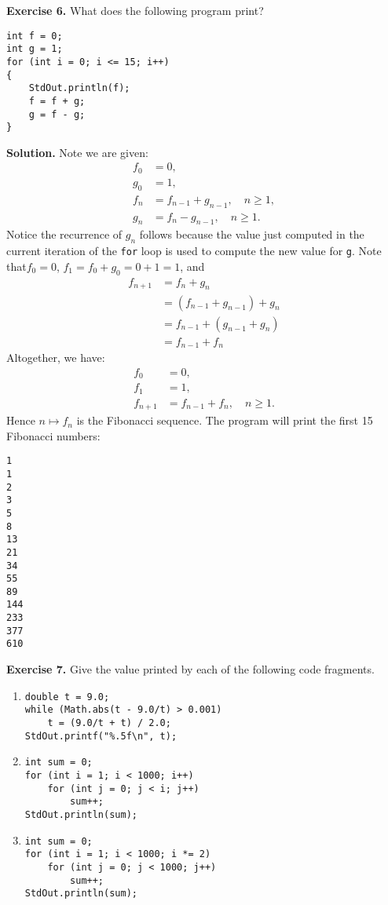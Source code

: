 \documentclass[12pt, a4paper]{article}
\newenvironment{ex}[2][Exercise]
{\par\medskip\noindent \textbf{#1 #2.}}
{\medskip}
\newenvironment{sol}[1][Solution]
{\par\medskip\noindent \textbf{#1.} }
{\medskip}
\begin{document}
	\begin{ex}{6}
		What does the following program print?
		\begin{lstlisting}
int f = 0;
int g = 1;
for (int i = 0; i <= 15; i++)
{
	StdOut.println(f);
	f = f + g;
	g = f - g;
}
		\end{lstlisting}
	\end{ex}
	\begin{sol}
		Note we are given:
		\begin{align*}
			f_0 &= 0,\\
			g_0 &= 1,\\
			f_{n} &= f_{n-1} + g_{n-1},\quad n\geq 1,\\
			g_{n} &= f_{n} - g_{n-1},\quad n\geq 1.
		\end{align*}
		Notice the recurrence of $g_n$ follows because the value just computed in the current
		iteration of the \texttt{for} loop is  used to compute the new value for \texttt{g}.
		Note that$f_0 = 0$, $f_1 = f_0 + g_0 = 0 + 1 = 1$, and
		\begin{align*}
		f_{n + 1} &= f_n + g_n\\
		&= (f_{n-1} + g_{n-1}) + g_n\\
		&=f_{n-1}  + (g_{n-1} +  g_n)\\
		&=f_{n-1} + f_n
		\end{align*}
		Altogether, we have:
		\begin{align*}
			f_0 &= 0, \\
			f_1 &= 1, \\
			f_{n + 1} &= f_{n-1} + f_n,\quad n \geq 1.
		\end{align*}
		Hence $n\mapsto f_n$ is the Fibonacci sequence. The program will print the first 15
		Fibonacci numbers:
		\begin{lstlisting}[language={}]
1
1
2
3
5
8
13
21
34
55
89
144
233
377
610
		\end{lstlisting}
	\end{sol}
	\begin{ex}{7}
		Give the value printed by each of the following code fragments.
		\begin{enumerate}[label=(\alph*)]
			\item 
			\begin{lstlisting}
double t = 9.0;
while (Math.abs(t - 9.0/t) > 0.001)
	t = (9.0/t + t) / 2.0;
StdOut.printf("%.5f\n", t);
			\end{lstlisting}
			\item
			\begin{lstlisting}
int sum = 0;
for (int i = 1; i < 1000; i++)
	for (int j = 0; j < i; j++)
		sum++;
StdOut.println(sum);
			\end{lstlisting}
			\item
			\begin{lstlisting}
int sum = 0;
for (int i = 1; i < 1000; i *= 2)
	for (int j = 0; j < 1000; j++)
		sum++;
StdOut.println(sum);
			\end{lstlisting}
		\end{enumerate}
	\end{ex}
\end{document}
